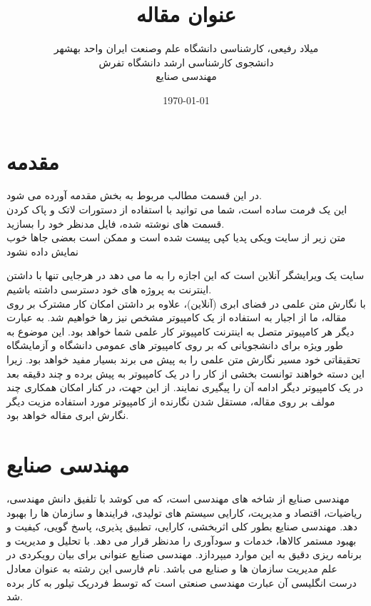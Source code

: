 \documentclass[12pt,onecolumn,a4paper]{article}
\begin{document}
\title{عنوان مقاله} 
\author{میلاد رفیعی، کارشناسی دانشگاه علم وصنعت ایران واحد بهشهر\\
دانشجوی کارشناسی ارشد دانشگاه تفرش\\
مهندسی صنایع}
\date{\today}
\maketitle

\section{مقدمه} 
در این قسمت مطالب مربوط به بخش مقدمه آورده می شود.\\
این یک فرمت ساده است، شما می توانید با استفاده از دستورات لاتک و پاک کردن قسمت های نوشته شده، فایل مدنظر خود را بسازید.\\
متن زیر از سایت ویکی پدیا کپی پیست شده است و ممکن است بعضی جاها خوب نمایش داده نشود


سایت  یک ویرایشگر آنلاین \lr{\LaTeX{}} است که این اجازه را به ما می دهد در هرجایی تنها با داشتن اینترنت به پروژه های خود دسترسی داشته باشیم.\\
با نگارش متن علمی در فضای ابری (آنلاین)، علاوه بر داشتن امکان کار مشترک بر روی مقاله، ما از اجبار به استفاده از یک کامپیوتر مشخص نیز رها خواهیم شد. به عبارت دیگر هر کامپیوتر متصل به اینترنت کامپیوتر کار علمی شما خواهد بود. این موضوع به طور ویژه برای دانشجویانی که بر روی کامپیوتر های عمومی دانشگاه و آزمایشگاه تحقیقاتی خود مسیر نگارش متن علمی را به پیش می برند بسیار مفید خواهد بود. زیرا این دسته خواهند توانست بخشی از کار را در یک کامپیوتر به پیش برده و چند دقیقه بعد در یک کامپیوتر دیگر ادامه آن را پیگیری نمایند. از این جهت، در کنار امکان همکاری چند مولف بر روی مقاله، مستقل شدن نگارنده از کامپیوتر مورد استفاده مزیت دیگر نگارش ابری مقاله خواهد بود.\\

\section{ مهندسی صنایع}
مهندسی صنایع   از شاخه های مهندسی است، که می کوشد با تلفیق دانش مهندسی، ریاضیات، اقتصاد و
مدیریت، کارایی سیستم های تولیدی، فرایندها و سازمان ها را بهبود دهد.
مهندسی صنایع بطور کلی اثربخشی، کارایی، تطبیق پذیری، پاسخ گویی، کیفیت و بهبود مستمر کالاها، خدمات و سودآوری را مدنظر قرار می دهد. با
تحلیل و مدیریت و برنامه ریزی دقیق به این موارد میپردازد.
مهندسی صنایع عنوانی برای بیان رویکردی در علم مدیریت سازمان ها و صنایع می باشد.
نام فارسی این رشته به عنوان معادل درست انگلیسی آن عبارت مهندسی صنعتی است که توسط فردریک تیلور به کار برده شد.
\end{document}
